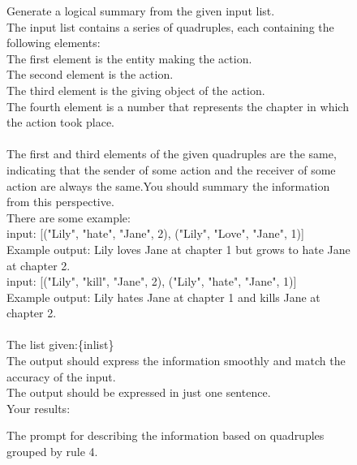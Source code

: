 \begin{figure}[htbp]
\centering
\begin{tcolorbox}
Generate a logical summary from the given input list. \\
The input list contains a series of quadruples, each containing the following elements:\\
The first element is the entity making the action.\\
The second element is the action.\\
The third element is the giving object of the action.\\
The fourth element is a number that represents the chapter in which the action took place.\\
\\
The first and third elements of the given quadruples are the same, indicating that the sender of some action and the receiver of some action are always the same.You should summary the information from this perspective.\\
There are some example:\\
input: [("Lily", "hate", "Jane", 2), ("Lily", "Love", "Jane", 1)]\\
Example output: Lily loves Jane at chapter 1 but grows to hate Jane at chapter 2.\\
input: [("Lily", "kill", "Jane", 2), ("Lily", "hate", "Jane", 1)]\\
Example output: Lily hates Jane at chapter 1 and kills Jane at chapter 2.\\
\\
The list given:\{inlist\}\\
The output should express the information smoothly and match the accuracy of the input.\\
The output should be expressed in just one sentence.\\
Your results:\\
\end{tcolorbox}
\caption{The prompt for describing the information based on quadruples grouped by rule 4.}
\label{tab:group trans4}
\end{figure}


